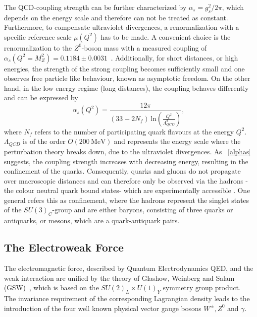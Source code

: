 \noindent The QCD-coupling strength can be further characterized by  $\alpha_s = g_s^2/2\pi$, which depends  on the energy scale and therefore can not be treated as constant. Furthermore, to compensate ultraviolet divergences, a renormalization with a specific reference scale $\mu(Q^2)$ has to be made. A convenient choice is the renormalization to the $Z^0$-boson mass with a measured coupling of $\alpha_s(Q^2=M_Z^2) = 0.1184 \pm 0.0031$~\cite{Bethke:2000ai}. Additionally, for short distances, or high energies, the strength of the strong coupling becomes sufficiently small and one observes free particle like behaviour, known as asymptotic freedom. On the other hand, in the low energy regime (long distances), the coupling behaves differently and can be expressed by 
\begin{equation}\label{alphas}
\alpha_s(Q^2)=\frac{12\pi}{(33-2N_f)~\text{ln}(\frac{Q^2}{\Lambda_{QCD}^2})},
\end{equation}
where $N_f$ refers to the number of participating quark flavours at the energy $Q^2$. $\Lambda_{QCD}$ is of the order $O(200~\text{MeV})$ and represents the energy scale where the perturbation theory  breaks down, due to the ultraviolet divergences. As ~\cref{alphas} suggests, the coupling strength increases with decreasing energy, resulting in the confinement of the quarks. Consequently, quarks and gluons do not propagate over macroscopic distances and can therefore only be observed via the hadrons -the colour neutral quark bound states- which are experimentally accessible . One general refers this as confinement, where the hadrons represent the singlet states of  the $SU(3)_C$-group and are either baryons, consisting of three quarks or antiquarks, or mesons, which are a quark-antiquark pairs. 
























\subsection{The Electroweak Force}\label{EW}
The electromagnetic force, described by Quantum Electrodynamics QED, and the weak interaction are unified by the theory of Glashow, Weinberg and Salam (GSW)~\cite{Glashow:1961tr,Weinberg:1967tq,Salam:1964ry}, which is based on the $SU(2)_L\times U(1)_Y$ symmetry group product. The invariance requirement of the corresponding Lagrangian density leads to the introduction of the four well known physical vector gauge bosons $W^{\pm}, Z^0$ and $\gamma$.

